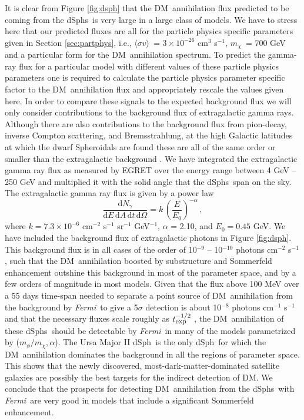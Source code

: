 \documentclass[aps,prd,twocolumn,amsmath,amssymb,floatfix,nofootinbib,10pt]{revtex4}
\newcommand{\ie}{i.e.}
\newcommand{\Fermi}{\emph{Fermi}}
\newcommand{\DM}{DM}
\newcommand{\mdm}{\ensuremath{m_{\chi}}}
\newcommand{\mv}{\ensuremath{m_{\phi}}}
\newcommand{\dd}{\mathrm{d}}
\newcommand{\Ngamma}{\ensuremath{N_{\gamma}}}
\newcommand{\sigmaannv}{\ensuremath{\langle\sigma v\rangle}}
\newcommand{\dSph}{dSph}
\newcommand{\dSphs}{dSphs}
\begin{document}
It is clear from Figure \ref{fig:dsph} that the \DM\ annihilation flux
predicted to be coming from the \dSphs\ is very large in a large class
of models. We have to stress here that our predicted fluxes are all
for the particle physics specific parameters given in Section
\ref{sec:partphys}, \ie, \sigmaannv\ = $3 \times 10^{-26}$ cm$^3$
s$^{-1}$, \mdm\ = 700 GeV and a particular form for the \DM\
annihilation spectrum. To predict the gamma-ray flux for a particular
model with different values of these particle physics parameters one
is required to calculate the particle physics parameter specific
factor to the \DM\ annihilation flux and appropriately rescale the
values given here. In order to compare these signals to the expected
background flux we will only consider contributions to the background
flux of extragalactic gamma rays. Although there are also
contributions to the background flux from pion-decay, inverse Compton
scattering, and Bremsstrahlung, at the high Galactic latitudes at
which the dwarf Spheroidals are found these are all of the same order
or smaller than the extragalactic background
\cite{2004ApJ...613..962S}. We have integrated the extragalactic gamma
ray flux as measured by EGRET over the energy range between 4 GeV --
250 GeV and multiplied it with the solid angle that the \dSphs\ span
on the sky. The extragalactic gamma ray flux is given by a power law
\cite{1998ApJ...494..523S}
\begin{equation}
\frac{\dd \Ngamma}{\dd E \,\dd A \, \dd t\,\dd \Omega} = k\,\left(\frac{E}{E_0}\right)^{-\alpha}\, ,
\end{equation}
where $k = 7.3 \times 10^{-6}$ cm$^{-2}$ s$^{-1}$ sr$^{-1}$
GeV$^{-1}$, $\alpha$ = 2.10, and $E_0 = 0.45$ GeV. We have included
the background flux of extragalactic photons in Figure
\ref{fig:dsph}. This background flux is in all cases of the order of
10$^{-9}$ -- 10$^{-10}$ photons cm$^{-2}$ s$^{-1}$, such that the \DM\
annihilation boosted by substructure and Sommerfeld enhancement
outshine this background in most of the parameter space, and by a few
orders of magnitude in most models. Given that the flux above 100 MeV
over a 55 days time-span needed to separate a point source of \DM\
annihilation from the background by \Fermi\ to give a 5$\sigma$
detection is about 10$^{-8}$ photons cm$^{-1}$ s$^{-1}$ and that the
necessary fluxes scale roughly as $t_{\mbox{{\footnotesize
exp}}}^{-1/2}$ \cite{2008JCAP...07..013B}, the \DM\ annihilation of
these \dSphs\ should be detectable by \Fermi\ in many of the models
parametrized by ($\mv/\mdm,\alpha$). The Ursa Major II \dSph\ is the
only \dSph\ for which the \DM\ annihilation dominates the background
in all the regions of parameter space. This shows that the newly
discovered, most-dark-matter-dominated satellite galaxies are possibly
the best targets for the indirect detection of \DM. We conclude that
the prospects for detecting \DM\ annihilation from the \dSphs\ with
\Fermi\ are very good in models that include a significant Sommerfeld
enhancement.
\end{document}
